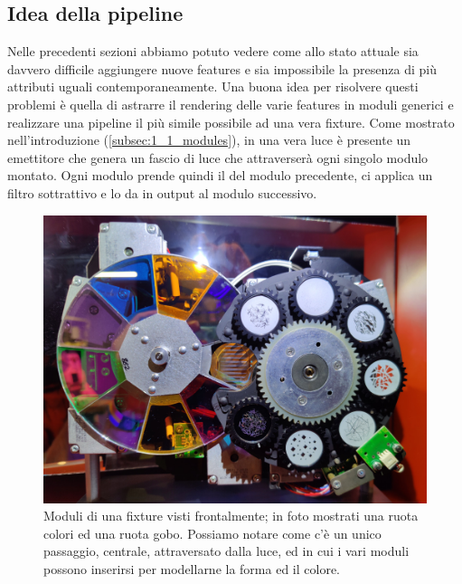 \documentclass[main.tex]{subfiles}
\begin{document}
\subsection{Idea della pipeline}\label{subsec:2_pipelineIdea}
Nelle precedenti sezioni abbiamo potuto vedere come allo stato attuale sia davvero difficile aggiungere nuove features e sia impossibile la presenza di più attributi uguali contemporaneamente. Una buona idea per risolvere questi problemi è quella di astrarre il rendering delle varie features in moduli generici e realizzare una pipeline il più simile possibile ad una vera fixture. Come mostrato nell'introduzione (\ref{subsec:1_1_modules}), in una vera luce è presente un emettitore che genera un fascio di luce che attraverserà ogni singolo modulo montato. Ogni modulo prende quindi il  del modulo precedente, ci applica un filtro sottrattivo e lo da in output al modulo successivo.
\begin{figure}[H]
    \centering
    \includegraphics[width=.8\linewidth]{img/renderingPipeline/modules.jpg}
    \caption{Moduli di una fixture visti frontalmente; in foto mostrati una ruota colori ed una ruota gobo. Possiamo notare come c'è un unico passaggio, centrale, attraversato dalla luce, ed in cui i vari moduli possono inserirsi per modellarne la forma ed il colore.}
    \label{fig:2_modules}
\end{figure}
\end{document}
